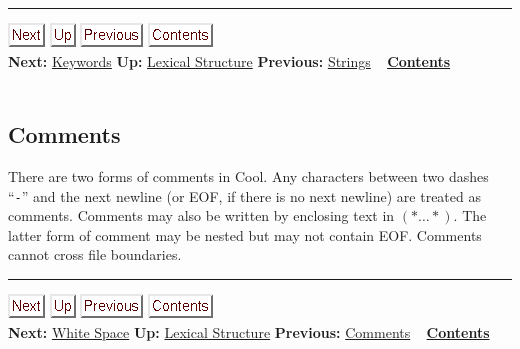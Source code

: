 \documentclass[]{article}
\begin{document}
\begin{center}\rule{3in}{0.4pt}\end{center}

\href{node37.html}{\includegraphics{next.png}}
\href{node33.html}{\includegraphics{up.png}}
\href{node35.html}{\includegraphics{prev.png}}
\href{node1.html}{\includegraphics{contents.png}} \\ \textbf{Next:}
\href{node37.html}{Keywords} \textbf{Up:} \href{node33.html}{Lexical
Structure} \textbf{Previous:} \href{node35.html}{Strings} ~
\textbf{\href{node1.html}{Contents}} \\ \\

\subsection{Comments}

There are two forms of comments in Cool. Any characters between two
dashes ``\texttt{-}'' and the next newline (or EOF, if there is no next
newline) are treated as comments. Comments may also be written by
enclosing text in $(\ast \ldots \ast )$. The latter form of comment may
be nested but may not contain EOF. Comments cannot cross file
boundaries.

\begin{center}\rule{3in}{0.4pt}\end{center}

\href{node38.html}{\includegraphics{next.png}}
\href{node33.html}{\includegraphics{up.png}}
\href{node36.html}{\includegraphics{prev.png}}
\href{node1.html}{\includegraphics{contents.png}} \\ \textbf{Next:}
\href{node38.html}{White Space} \textbf{Up:} \href{node33.html}{Lexical
Structure} \textbf{Previous:} \href{node36.html}{Comments} ~
\textbf{\href{node1.html}{Contents}} \\ \\
\end{document}
